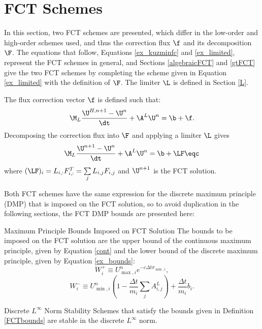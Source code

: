 \section{FCT Schemes}
In this section, two FCT schemes are presented, which
differ in the low-order and high-order schemes used, and thus the
correction flux $\f$ and its decomposition $\F$.
The equations that follow, Equations \eqref{ex_kuzminfc} and
\eqref{ex_limited}, represent the FCT schemes in general, and
Sections \ref{algebraicFCT} and \ref{gtFCT} give the two FCT
schemes by completing the scheme given in Equation \eqref{ex_limited}
with the definition of $\F$. The limiter $\L$ is
defined in Section \ref{L}.

The flux correction vector $\f$ is defined such that:
\begin{equation}\label{ex_kuzminfc}
   \M_L\frac{\U^{H,n+1}-\U^n}{\dt} + \A^L\U^n = \b + \f.
\end{equation}
Decomposing the correction flux into $\F$ and applying a limiter
$\L$ gives
\begin{equation}\label{ex_limited}
   \M_L\frac{\U^{n+1}-\U^n}{\dt} + \A^L\U^n = \b + \LF \eqc
\end{equation}
where $(\LF)_i = L_{i,:}F_{i,:}^T
= \sum\limits_j L_{i,j}F_{i,j}$ and $\U^{n+1}$
is the FCT solution.

Both FCT schemes have the same expression for the discrete maximum principle (DMP)
that is imposed on the FCT solution, so to avoid duplication in the following
sections, the FCT DMP bounds are presented here:
\begin{definition}[label={FCTbounds}]{Maximum Principle Bounds Imposed on FCT Solution}
   The bounds to be imposed on the FCT solution are the upper bound of the
   continuous maximum principle, given by Equation \eqref{cont} and the
   lower bound of the discrete maximum principle, given by Equation
   \eqref{ex_bounds}:
   \begin{equation}\label{FCTupper}
      W_i^+\equiv U_{\max,i}^n e^{-c\Delta t\sigma_{\min,i}},
   \end{equation}
   \begin{equation}\label{FCTlower}
      W_i^-\equiv U_{\min,i}^n\left(1-\frac{\Delta t}{m_i}\sum\limits_j A^L_{i,j}\right)
      + \frac{\Delta t}{m_i}b_i.
   \end{equation}
\end{definition}
\begin{proposition}{Discrete $L^\infty$ Norm Stability}
   Schemes that satisfy the bounds given in Definition \ref{FCTbounds} are
   stable in the discrete $L^\infty$ norm.
\end{proposition}

